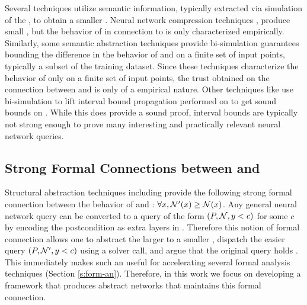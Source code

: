 Several techniques utilize semantic information, typically extracted via
simulation of the \dnn, to obtain a smaller \abs. 
Neural network compression techniques \cite{dnn-compression}, produce small
\abs, but the
behavior of \abs in connection to \cnc is only characterized empirically.
Similarly, some semantic abstraction techniques \cite{lin-comb-abs-jan} provide
bi-simulation guarantees bounding the difference in the behavior of \abs and
\cnc on a finite set of input points, typically a subset of the training
dataset. Since these techniques characterize the behavior of \abs only on a
finite set of
input points, the trust obtained on the connection between \cnc and \abs is only
of a empirical nature.
Other techniques like \cite{deep-abstract} use bi-simulation to lift
interval bound propagation performed on \abs to get sound bounds on \cnc. While
this does provide a sound proof, interval bounds are typically not strong enough
to prove many interesting and practically relevant neural network queries.

\subsection{Strong Formal Connections between \cnc and \abs}
\label{s:conc-abs}

Structural abstraction techniques including \cite{cegar-nn} provide the
following strong formal connection between the behavior of \cnc and \abs:
$\forall x, \mathcal{N'}(x) \geq \mathcal{N}(x)$. 
Any general neural network query can be converted to a query of
the form \linebreak $(P, \mathcal{N}, y < c)$ for some $c$
by encoding the postcondition as extra layers in \cnc 
\cite{cegar-nn,reluplex,lipschitz-reach}.
Therefore this notion of formal connection allows one to abstract the larger
\cnc to a smaller \abs, dispatch the
easier query $(P, \mathcal{N'}, y < c)$ using a solver call, and argue that the
original query holds \cite{cegar-nn,cegarette,cleverest-nn}. 
This immediately makes such an \abs useful
for accelerating several formal analysis techniques (Section \ref{s:form-an}).
Therefore, in this work we focus on developing a framework that produces
abstract networks that maintains this formal connection.

